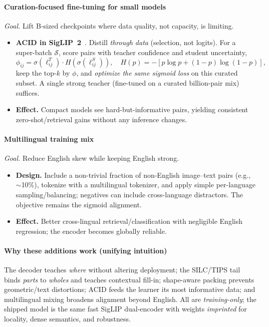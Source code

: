 \begin{enrichment}
\begin{enrichment}
        \paragraph{Curation-focused fine-tuning for small models}
        \noindent\emph{Goal.} Lift B-sized checkpoints where data quality, not capacity, is limiting.
        \begin{itemize}
            \item \textbf{ACID in SigLIP~2}~\cite{udandarao2025_acid}. Distill \emph{through data} (selection, not logits). For a super-batch $\mathcal{S}$, score pairs with teacher confidence and student uncertainty,
            \[
            \phi_{ij}=\sigma(\ell^T_{ij})\cdot H(\sigma(\ell^S_{ij})),\quad H(p)=-[p\log p+(1-p)\log(1-p)],
            \]
            keep the top-$k$ by $\phi$, and \emph{optimize the same sigmoid loss} on this curated subset. A single strong teacher (fine-tuned on a curated billion-pair mix) suffices.
            \item \textbf{Effect.} Compact models see hard-but-informative pairs, yielding consistent zero-shot/retrieval gains without any inference changes.
        \end{itemize}
        
        \paragraph{Multilingual training mix}
        \noindent\emph{Goal.} Reduce English skew while keeping English strong.
        \begin{itemize}
            \item \textbf{Design.} Include a non-trivial fraction of non-English image–text pairs (e.g., $\sim$10\%), tokenize with a multilingual tokenizer, and apply simple per-language sampling/balancing; negatives can include cross-language distractors. The objective remains the sigmoid alignment.
            \item \textbf{Effect.} Better cross-lingual retrieval/classification with negligible English regression; the encoder becomes globally reliable.
        \end{itemize}
        
        \paragraph{Why these additions work (unifying intuition)}
        The decoder teaches \emph{where} without altering deployment; the SILC/TIPS tail binds \emph{parts} to \emph{wholes} and teaches contextual fill-in; shape-aware packing prevents geometric/text distortions; ACID feeds the learner its most informative data; and multilingual mixing broadens alignment beyond English. All are \emph{training-only}; the shipped model is the same fast SigLIP dual-encoder with weights \emph{imprinted} for locality, dense semantics, and robustness.
        

\end{enrichment}
\end{enrichment}
